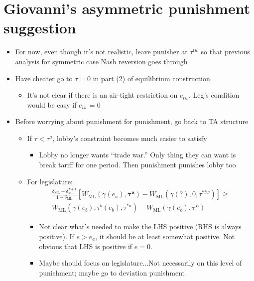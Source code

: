 \documentclass[12pt]{article}
\newcommand{\bta}{\bm{\tau^a}}
\newcommand{\ga}{\gamma}
\newcommand{\de}{\delta}
\begin{document}
\newpage
\section{Giovanni's asymmetric punishment suggestion}
\begin{itemize}
	\item For now, even though it's not realistic, leave punisher at $\tau^{tw}$ so that previous analysis for symmetric case Nash reversion goes through
	\item Have cheater go to $\tau = 0$ in part (2) of equilibrium construction
		\begin{itemize}
			\item It's not clear if there is an air-tight restriction on $e_{tw}$. Leg's condition would be easy if $e_{tw} = 0$
		\end{itemize}
	\item Before worrying about punishment for punishment, go back to TA structure
		\begin{itemize}
			\item If $\tau < \tau^a$, lobby's constraint becomes much easier to satisfy
				\begin{itemize}
					\item Lobby no longer wants ``trade war.'' Only thing they can want is break tariff for one period. Then punishment punishes lobby too
				\end{itemize}
			\item For legislature:
				\begin{multline}
  \frac{\de_\text{ML} - \de_\text{ML}^{T+1}}{1-\de_\text{ML}} \left[W_\text{ML}(\ga(e_a),\bta) - W_{\text{ML}}(\ga(?),0,\tau^{*tw}) \right] \geq \\
	W_{\text{ML}}(\ga(e_b),\tau^b(e_b),\tau^{*a}) - W_{\text{ML}}(\ga(e_b),\bta)
				\end{multline}
				\begin{itemize}
					\item Not clear what's needed to make the LHS positive (RHS is always positive). If $e > e_a$, it should be at least somewhat positive. Not obvious that LHS is positive if $e=0$.
					\item Maybe should focus on legislature...Not necessarily on this level of punishment; maybe go to deviation punishment
				\end{itemize}

		\end{itemize}
	
\end{itemize}

	
\end{document}
